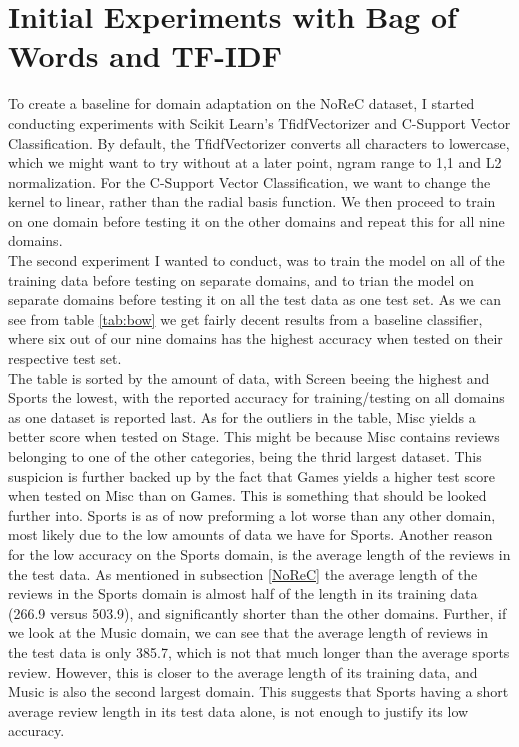 \section{Initial Experiments with Bag of Words and TF-IDF}
To create a baseline for domain adaptation on the NoReC dataset, I started conducting experiments with Scikit Learn's TfidfVectorizer and C-Support Vector Classification. By default, the TfidfVectorizer converts all characters to lowercase, which we might want to try without at a later point, ngram range to 1,1 and L2 normalization. For the C-Support Vector Classification, we want to change the kernel to linear, rather than the radial basis function. We then proceed to train on one domain before testing it on the other domains and repeat this for all nine domains.\\
The second experiment I wanted to conduct, was to train the model on all of the training data before testing on separate domains, and to trian the model on separate domains before testing it on all the test data as one test set. As we can see from table \ref{tab:bow} we get fairly decent results from a baseline classifier, where six out of our nine domains has the highest accuracy when tested on their respective test set.\\
The table is sorted by the amount of data, with Screen beeing the highest and Sports the lowest, with the reported accuracy for training/testing on all domains as one dataset is reported last. As for the outliers in the table, Misc yields a better score when tested on Stage. This might be because Misc contains reviews belonging to one of the other categories, being the thrid largest dataset. This suspicion is further backed up by the fact that Games yields a higher test score when tested on Misc than on Games. This is something that should be looked further into. Sports is as of now preforming a lot worse than any other domain, most likely due to the low amounts of data we have for Sports. Another reason for the low accuracy on the Sports domain, is the average length of the reviews in the test data. As mentioned in subsection \ref{NoReC} the average length of the reviews in the Sports domain is almost half of the length in its training data (266.9 versus 503.9), and significantly shorter than the other domains. Further, if we look at the Music domain, we can see that the average length of reviews in the test data is only 385.7, which is not that much longer than the average sports review. However, this is closer to the average length of its training data, and Music is also the second largest domain. This suggests that Sports having a short average review length in its test data alone, is not enough to justify its low accuracy. \\

